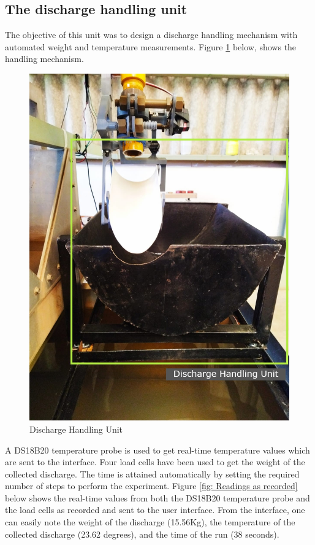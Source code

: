 \subsection{The discharge handling unit}
The objective of this unit was to design a discharge handling mechanism with automated weight and temperature measurements. Figure \ref{fig: Discharge Handling Unit} below, shows the handling mechanism. 
\begin{figure}[H]
            \centering
            \includegraphics[height=.5\textheight]{Figures/discharge handling results.jpg}
            \caption{Discharge Handling Unit}
            \label{fig: Discharge Handling Unit}
        \end{figure}
A DS18B20 temperature probe is used to get real-time temperature values which are sent to the interface. Four load cells have been used to get the weight of the collected discharge. The time is attained automatically by setting the required number of steps to perform the experiment. Figure \ref{fig: Readings as recorded} below shows the real-time values from both the DS18B20 temperature probe and the load cells as recorded and sent to the user interface. From the interface, one can easily note the weight of the discharge (15.56Kg), the temperature of the collected discharge (23.62 degrees), and the time of the run (38 seconds).
